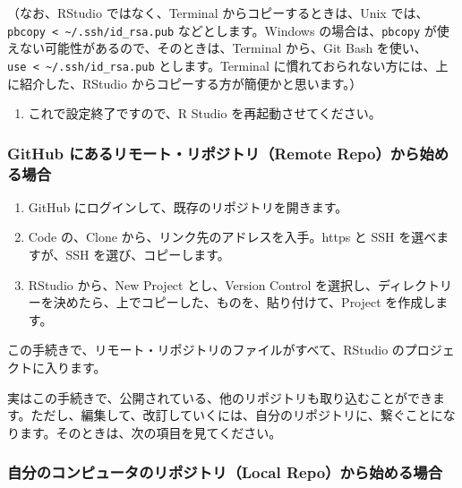 \documentclass[
]{bxjsbook}
\providecommand{\tightlist}{%
  \setlength{\itemsep}{0pt}\setlength{\parskip}{0pt}}
\theoremstyle{definition}
\theoremstyle{definition}
\theoremstyle{definition}
\theoremstyle{definition}
\theoremstyle{remark}
\begin{document}
（なお、RStudio ではなく、Terminal からコピーするときは、Unix では、\texttt{pbcopy\ \textless{}\ \textasciitilde{}/.ssh/id\_rsa.pub} などとします。Windows の場合は、\texttt{pbcopy} が使えない可能性があるので、そのときは、Terminal から、Git Bash を使い、\texttt{use\ \textless{}\ \textasciitilde{}/.ssh/id\_rsa.pub} とします。Terminal に慣れておられない方には、上に紹介した、RStudio からコピーする方が簡便かと思います。）

\begin{enumerate}
\def\labelenumi{\arabic{enumi}.}
\setcounter{enumi}{6}
\tightlist
\item
  これで設定終了ですので、R Studio を再起動させてください。
\end{enumerate}

\hypertarget{github-ux306bux3042ux308bux30eaux30e2ux30fcux30c8ux30eaux30ddux30b8ux30c8ux30earemote-repoux304bux3089ux59cbux3081ux308bux5834ux5408}{%
\subsubsection{GitHub にあるリモート・リポジトリ（Remote Repo）から始める場合}\label{github-ux306bux3042ux308bux30eaux30e2ux30fcux30c8ux30eaux30ddux30b8ux30c8ux30earemote-repoux304bux3089ux59cbux3081ux308bux5834ux5408}}

\begin{enumerate}
\def\labelenumi{\arabic{enumi}.}
\tightlist
\item
  GitHub にログインして、既存のリポジトリを開きます。
\item
  Code の、Clone から、リンク先のアドレスを入手。https と SSH を選べますが、SSH を選び、コピーします。
\item
  RStudio から、New Project とし、Version Control を選択し、ディレクトリーを決めたら、上でコピーした、ものを、貼り付けて、Project を作成します。
\end{enumerate}

この手続きで、リモート・リポジトリのファイルがすべて、RStudio のプロジェクトに入ります。

実はこの手続きで、公開されている、他のリポジトリも取り込むことができます。ただし、編集して、改訂していくには、自分のリポジトリに、繋ぐことになります。そのときは、次の項目を見てください。

\hypertarget{ux81eaux5206ux306eux30b3ux30f3ux30d4ux30e5ux30fcux30bfux306eux30eaux30ddux30b8ux30c8ux30ealocal-repoux304bux3089ux59cbux3081ux308bux5834ux5408}{%
\subsubsection{自分のコンピュータのリポジトリ（Local Repo）から始める場合}\label{ux81eaux5206ux306eux30b3ux30f3ux30d4ux30e5ux30fcux30bfux306eux30eaux30ddux30b8ux30c8ux30ealocal-repoux304bux3089ux59cbux3081ux308bux5834ux5408}}
\end{document}

